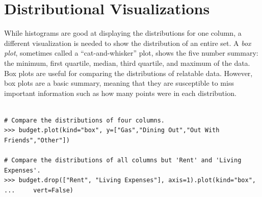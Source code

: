 \section*{Distributional Visualizations} %

While histograms are good at displaying the distributions for one column, a different visualization is needed to show the distribution of an entire set.
A \emph{box plot}, sometimes called a ``cat-and-whisker'' plot, shows the five number summary: the minimum, first quartile, median, third quartile, and maximum of the data.
Box plots are useful for comparing the distributions of relatable data.
However, box plots are a basic summary, meaning that they are susceptible to  miss important information such as how many points were in each distribution.

\begin{lstlisting}

# Compare the distributions of four columns.
>>> budget.plot(kind="box", y=["Gas","Dining Out","Out With Friends","Other"])

# Compare the distributions of all columns but 'Rent' and 'Living Expenses'.
>>> budget.drop(["Rent", "Living Expenses"], axis=1).plot(kind="box",
...		vert=False)
\end{lstlisting}

